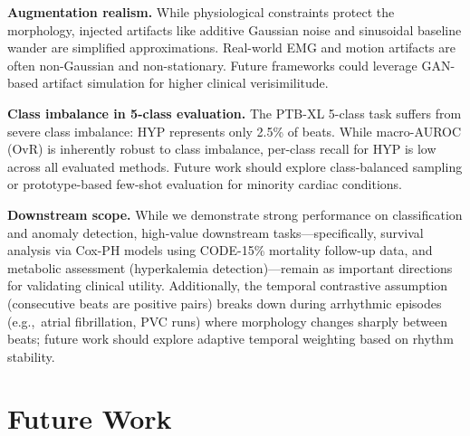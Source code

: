 \documentclass[journal,10pt]{IEEEtran}
\newcommand{\eg}{e.g.,~}
\begin{document}
\noindent\textbf{Augmentation realism.} While physiological constraints protect the morphology, injected artifacts like additive Gaussian noise and sinusoidal baseline wander are simplified approximations. Real-world EMG and motion artifacts are often non-Gaussian and non-stationary. Future frameworks could leverage GAN-based artifact simulation for higher clinical verisimilitude.

\noindent\textbf{Class imbalance in 5-class evaluation.} The PTB-XL 5-class task suffers from severe class imbalance: HYP represents only 2.5\% of beats. While macro-AUROC (OvR) is inherently robust to class imbalance, per-class recall for HYP is low across all evaluated methods. Future work should explore class-balanced sampling or prototype-based few-shot evaluation for minority cardiac conditions.

\noindent\textbf{Downstream scope.} While we demonstrate strong performance on classification and anomaly detection, high-value downstream tasks---specifically, survival analysis via Cox-PH models using CODE-15\% mortality follow-up data, and metabolic assessment (hyperkalemia detection)---remain as important directions for validating clinical utility. Additionally, the temporal contrastive assumption (consecutive beats are positive pairs) breaks down during arrhythmic episodes (\eg atrial fibrillation, PVC runs) where morphology changes sharply between beats; future work should explore adaptive temporal weighting based on rhythm stability.



\section{Future Work}
\label{sec:future}
\end{document}
